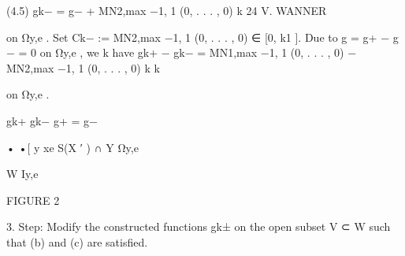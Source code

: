 \documentclass[
  10pt,
]{article}
\newenvironment{Shaded}{}{}
\newcommand{\NormalTok}[1]{#1}
\begin{document}
\begin{Shaded}
\begin{Highlighting}[]
\NormalTok{(4.5)                           gk− = g− + MN2,max −1, 1 (0, . . . , 0)}
\NormalTok{                                                                k}
\NormalTok{24                                                   V. WANNER}


\NormalTok{on Ωy,e . Set Ck− := MN2,max −1, 1 (0, . . . , 0) ∈ [0, k1 ]. Due to g = g+ − g − = 0 on Ωy,e , we}
\NormalTok{                                 k}
\NormalTok{have}
\NormalTok{                      gk+ − gk− = MN1,max −1, 1 (0, . . . , 0) − MN2,max −1, 1 (0, . . . , 0)}
\NormalTok{                                                 k                             k}

\NormalTok{on Ωy,e .}



\NormalTok{                                                                                gk+}
\NormalTok{                                                                                gk−}
\NormalTok{                                                                                       g+ = g−}




\NormalTok{            •                      •[}
\NormalTok{                                   y                                                  xe}
\NormalTok{                S(X ′ ) ∩ Y                                Ωy,e}

\NormalTok{     W                                                     Iy,e}


\NormalTok{                                                      FIGURE 2}


\NormalTok{ 3. Step: Modify the constructed functions gk± on the open subset V ⊂ W}
\NormalTok{          such that (b) and (c) are satisfied.}


\end{Highlighting}
\end{Shaded}
\end{document}
